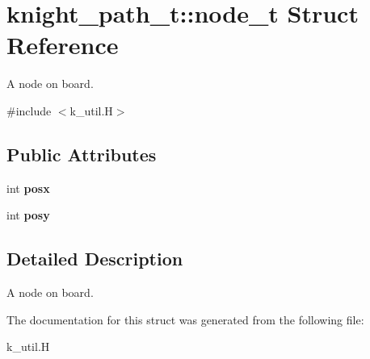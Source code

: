 \hypertarget{structknight__path__t_1_1node__t}{\section{knight\-\_\-path\-\_\-t\-:\-:node\-\_\-t \-Struct \-Reference}
\label{structknight__path__t_1_1node__t}
}


\-A node on board.  




{\ttfamily \#include $<$k\-\_\-util.\-H$>$}

\subsection*{\-Public \-Attributes}
\begin{DoxyCompactItemize}
\item 
\hypertarget{structknight__path__t_1_1node__t_a430aa02a42429500f4d831819aef898b}{int {\bfseries posx}}\label{structknight__path__t_1_1node__t_a430aa02a42429500f4d831819aef898b}

\item 
\hypertarget{structknight__path__t_1_1node__t_a8d1fca4e5eeafa402ee81a13a49dddfb}{int {\bfseries posy}}\label{structknight__path__t_1_1node__t_a8d1fca4e5eeafa402ee81a13a49dddfb}

\end{DoxyCompactItemize}


\subsection{\-Detailed \-Description}
\-A node on board. 

\-The documentation for this struct was generated from the following file\-:\begin{DoxyCompactItemize}
\item 
k\-\_\-util.\-H\end{DoxyCompactItemize}
